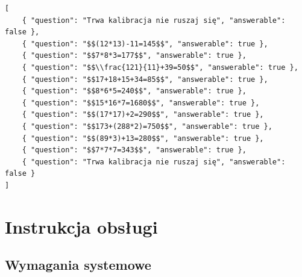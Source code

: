 \documentclass{./assets/wfis}
\begin{document}
\clearpage


\begin{lstlisting}[caption={Plik konfiguracji wyświetlanych pytań},label={pytania-badania}]
[
    { "question": "Trwa kalibracja nie ruszaj się", "answerable": false },
    { "question": "$$(12*13)-11=145$$", "answerable": true },
    { "question": "$$7*8*3=177$$", "answerable": true },
    { "question": "$$\\frac{121}{11}+39=50$$", "answerable": true },
    { "question": "$$17+18+15+34=85$$", "answerable": true },
    { "question": "$$8*6*5=240$$", "answerable": true },
    { "question": "$$15*16*7=1680$$", "answerable": true },
    { "question": "$$(17*17)+2=290$$", "answerable": true },
    { "question": "$$173+(288*2)=750$$", "answerable": true },
    { "question": "$$(89*3)+13=280$$", "answerable": true },
    { "question": "$$7*7*7=343$$", "answerable": true },
    { "question": "Trwa kalibracja nie ruszaj się", "answerable": false }
]
\end{lstlisting}


\chapter{Instrukcja obsługi}\label{instrukcja}
\section{Wymagania systemowe}
\end{document}
